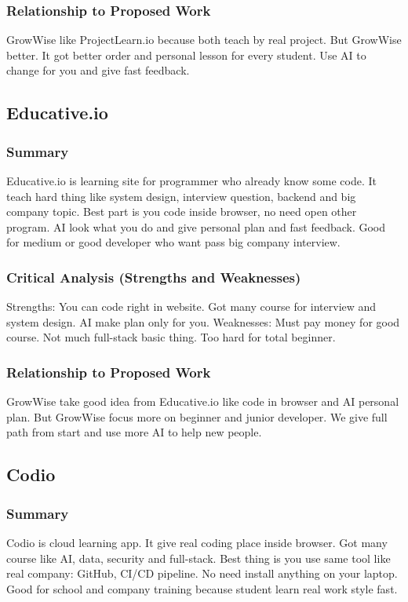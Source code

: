\documentclass{FastFyp}
\begin{document}
\subsubsection{Relationship to Proposed Work}
GrowWise like ProjectLearn.io because both teach by real project. But GrowWise better. It got better order and personal lesson for every student. Use AI to change for you and give fast feedback.

\subsection{Educative.io}

\subsubsection{Summary}
Educative.io \cite{ref:Educative} is learning site for programmer who already know some code. It teach hard thing like system design, interview question, backend and big company topic. Best part is you code inside browser, no need open other program. AI look what you do and give personal plan and fast feedback. Good for medium or good developer who want pass big company interview.

\subsubsection{Critical Analysis (Strengths and Weaknesses)}
Strengths: You can code right in website. Got many course for interview and system design. AI make plan only for you.  
Weaknesses: Must pay money for good course. Not much full-stack basic thing. Too hard for total beginner.

\subsubsection{Relationship to Proposed Work}
GrowWise take good idea from Educative.io like code in browser and AI personal plan. But GrowWise focus more on beginner and junior developer. We give full path from start and use more AI to help new people.


\subsection{Codio}

\subsubsection{Summary}
Codio \cite{ref:Codio} is cloud learning app. It give real coding place inside browser. Got many course like AI, data, security and full-stack. Best thing is you use same tool like real company: GitHub, CI/CD pipeline. No need install anything on your laptop. Good for school and company training because student learn real work style fast.
\end{document}

